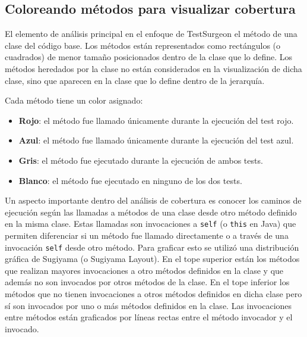 
\subsection{Coloreando métodos para visualizar cobertura}

\par El elemento de análisis principal en el enfoque de TestSurgeon el método de una clase del código base. Los métodos están representados como rectángulos (o cuadrados) de menor tamaño posicionados dentro de la clase que lo define.  Los métodos heredados por la clase no están considerados en la visualización de dicha clase, sino que aparecen en la clase que lo define dentro de la jerarquía.  

\par Cada método tiene un color asignado:
\begin{itemize}
\item {\bf Rojo}: el método fue llamado únicamente durante la ejecución del test rojo.
\item {\bf Azul}: el método fue llamado únicamente durante la ejecución del test azul.
\item {\bf Gris}: el método fue ejecutado durante la ejecución de ambos tests.
\item {\bf Blanco}: el método fue ejecutado en ninguno de los dos tests.
\end{itemize}

\par Un aspecto importante dentro del análisis de cobertura es conocer los caminos de ejecución según las llamadas a métodos de una clase desde otro método definido en la misma clase. Estas llamadas son invocaciones a {\tt self} (o {\tt this} en Java) que permiten diferenciar si un método fue llamado directamente o a través de una invocación {\tt self} desde otro método. Para graficar esto se utilizó una distribución gráfica de Sugiyama (o Sugiyama Layout). En el tope superior están los métodos que realizan mayores invocaciones a otro métodos definidos en la clase y que además no son invocados por otros métodos de la clase. En el tope inferior los métodos que no tienen invocaciones a otros métodos definidos en dicha clase pero sí son invocados por uno o más métodos definidos en la clase. Las invocaciones entre métodos están graficados por líneas rectas entre el método invocador y el invocado.

